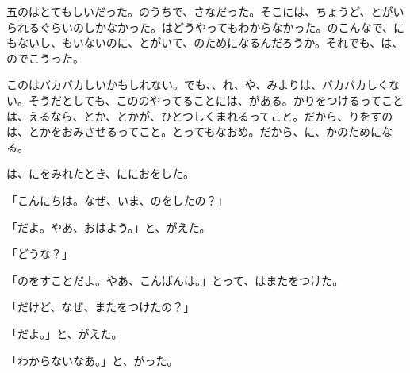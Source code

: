 五のはとてもしいだった。のうちで、さなだった。そこには、ちょうど、とがいられるぐらいのしかなかった。はどうやってもわからなかった。のこんなで、にもないし、もいないのに、とがいて、のためになるんだろうか。それでも、は、のでこうった。

このはバカバカしいかもしれない。でも、、れ、や、みよりは、バカバカしくない。そうだとしても、こののやってることには、がある。かりをつけるってことは、えるなら、とか、とかが、ひとつしくまれるってこと。だから、りをすのは、とかをおみさせるってこと。とってもなおめ。だから、に、かのためになる。

は、にをみれたとき、ににおをした。

「こんにちは。なぜ、いま、のをしたの？」

「だよ。やあ、おはよう。」と、がえた。

「どうな？」

「のをすことだよ。やあ、こんばんは。」とって、はまたをつけた。

「だけど、なぜ、またをつけたの？」

「だよ。」と、がえた。

「わからないなあ。」と、がった。

